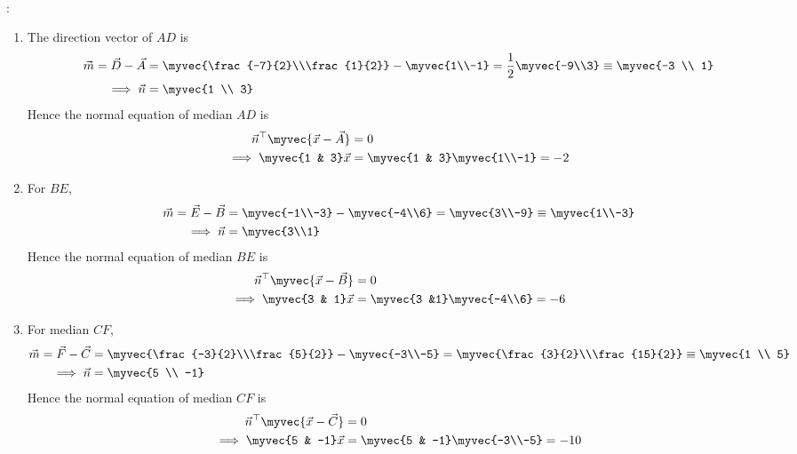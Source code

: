 \\ \solution:
\begin{enumerate}
 \item The direction vector of $AD$ is 
\begin{align}
	\vec{m} = \vec{D}- \vec{A}
&=\myvec{\frac{-7}{2}\\\frac{1}{2}} - \myvec{1\\-1}
	=\frac{1}{2}\myvec{-9\\3} \equiv \myvec{-3 \\ 1}
	\\
	\implies  \vec{n} &=\myvec{1 \\ 3}
\end{align}
Hence the normal equation of median $AD$ is 
\begin{align}
\vec{n}^{\top}\myvec{\vec{x}-\vec{A}}&=0\\
\implies    \myvec{1 & 3}\vec{x}&=\myvec{1 & 3}\myvec{1\\-1}
    =-2
	\label{eq:median-ad}
\end{align}
\item For $BE$,
\begin{align}
	\vec{m}= \vec{E}- \vec{B}&=\myvec{-1\\-3} - \myvec{-4\\6}
       =\myvec{3\\-9}
       \equiv \myvec{1\\-3}
       \\
\implies 	
\vec{n} &= 
         \myvec{3\\1}
\end{align}
Hence the normal equation of median $BE$ is 
\begin{align}
\vec{n}^{\top}\myvec{\vec{x}-\vec{B}}&=0\\
\implies
	\myvec{3 & 1}   \vec{x}&=\myvec{3 &1}\myvec{-4\\6}
    =-6
	\label{eq:median-be}
\end{align}
\item For median $CF$,
\begin{align}
	\vec{m} = \vec{F}- \vec{C} &=
\myvec{\frac{-3}{2}\\\frac{5}{2}} - \myvec{-3\\-5}
       =\myvec{\frac{3}{2}\\\frac{15}{2}}
       \equiv \myvec{1 \\ 5}
       \\
	\implies \vec{n} &=\myvec{5 \\ -1}
\end{align}
Hence the normal equation of median $CF$ is 
\begin{align}
\vec{n}^{\top}\myvec{\vec{x}-\vec{C}}&=0\\
	\implies \myvec{5 & -1}\vec{x}&=\myvec{5 & -1}\myvec{-3\\-5}
    =-10
	\label{eq:median-cf}
\end{align}
\end{enumerate}
